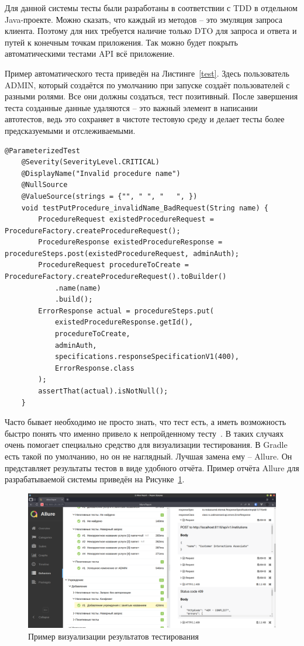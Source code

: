 \documentclass[a4paper,article]{article}
\begin{document}
\begin{sloppypar}
    Для данной системы тесты были разработаны в соответствии с TDD в отдельном Java-проекте. Можно сказать, что каждый из методов -- это эмуляция запроса клиента. Поэтому для них требуется наличие только DTO для запроса и ответа и путей к конечным точкам приложения. Так можно будет покрыть автоматическими тестами API всё приложение.

    Пример автоматического теста приведён на Листинге~\ref{test}. Здесь пользователь ADMIN, который создаётся по умолчанию при запуске создаёт пользователей с разными ролями. Все они должны создаться, тест позитивный. После завершения теста созданные данные удаляются -- это важный элемент в написании автотестов, ведь это сохраняет в чистоте тестовую среду и делает тесты более предсказуемыми и отслеживаемыми.

    \begin{lstlisting}[label=test,caption=Пример автотеста для разработанной системы]
    @ParameterizedTest
    @Severity(SeverityLevel.CRITICAL)
    @DisplayName("Invalid procedure name")
    @NullSource
    @ValueSource(strings = {"", " ", "   ", })
    void testPutProcedure_invalidName_BadRequest(String name) {
        ProcedureRequest existedProcedureRequest = ProcedureFactory.createProcedureRequest();
        ProcedureResponse existedProcedureResponse = procedureSteps.post(existedProcedureRequest, adminAuth);
        ProcedureRequest procedureToCreate = ProcedureFactory.createProcedureRequest().toBuilder()
            .name(name)
            .build();
        ErrorResponse actual = procedureSteps.put(
            existedProcedureResponse.getId(),
            procedureToCreate,
            adminAuth,
            specifications.responseSpecificationV1(400),
            ErrorResponse.class
        );
        assertThat(actual).isNotNull();
    }
    \end{lstlisting}

    Часто бывает необходимо не просто знать, что тест есть, а иметь возможность быстро понять что именно привело к непройденному тесту~\cite{springguide}. В таких случаях очень помогает специально средство для визуализации тестирования. В Gradle есть такой по умолчанию, но он не наглядный. Лучшая замена ему -- Allure. Он представляет результаты тестов в виде удобного отчёта. Пример отчёта Allure для разрабатываемой системы приведён на Рисунке~\ref{fig:Allure}.

    \begin{figure}[h]
        \centering
        \includegraphics[width=0.8\linewidth]{Allure.png}
        \caption{\centering Пример визуализации результатов тестирования}
        \label{fig:Allure}
    \end{figure}


\end{sloppypar}
\end{document}

